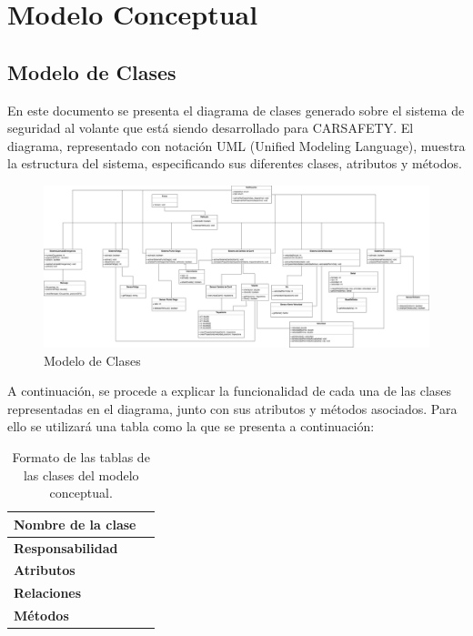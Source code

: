 \chapter{Modelo Conceptual}
\section {Modelo de Clases}
\par En este documento se presenta el diagrama de clases generado sobre el sistema de seguridad al volante que está siendo desarrollado para CARSAFETY. El diagrama, representado con notación UML (Unified Modeling Language), muestra la estructura del sistema, especificando sus diferentes clases, atributos y métodos.

\begin{figure}[h]
\begin{center}
\includegraphics[width=1\textwidth]{./img/m_clases.png}
\end{center}
\caption{Modelo de Clases}
\label{tab:m_clases}
\end{figure}

\par A continuación, se procede a explicar la funcionalidad de cada una de las clases representadas en el diagrama, junto con sus atributos y métodos asociados. Para ello se utilizará una tabla como la que se presenta a continuación:

\begin{table}[h]
\begin{center}
\begin{tabular}{p{} p{11cm}}
\textbf{Nombre de la clase} &  \\ \hline \hline
\textbf{Responsabilidad} &  \\ \hline
\textbf{Atributos} &  \\ \hline
\textbf{Relaciones} & \\ \hline
\textbf{Métodos} &  \\ \hline
\end{tabular}
\caption{Formato de las tablas de las clases del modelo conceptual.}
\label{tab:formatoD_clases}
\end{center}
\end{table}

